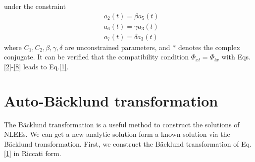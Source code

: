 \documentclass[12pt]{article}
\begin{document}
under the constraint
\begin{align}
  & a_{2}(t) = \beta a_{5}(t) \\
  & a_{6}(t) = \gamma a_{3}(t) \\
  & a_{7}(t) = \delta a_{3}(t)
\end{align}
where $C_{1}, C_{2}, \beta, \gamma, \delta$ are unconstrained parameters, and $*$ denotes the complex conjugate. It can be verified that the compatibility condition $\Phi_{xt} = \Phi_{tx}$ with Eqs.\eqref{2}-\eqref{8} leads to Eq.\eqref{1}.

\section{Auto-B\"acklund transformation}
The B\"acklund transformation is a useful method to construct the solutions of NLEEs. We can get a new analytic solution form a known solution via the B\"acklund transformation. First, we construct the B\"acklund transformation of Eq.\eqref{1} in Riccati form.
\end{document}
